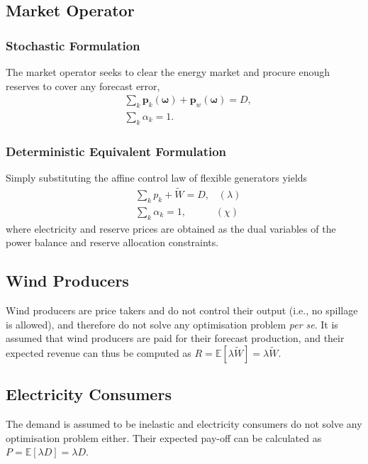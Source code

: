 \documentclass{article}
\begin{document}
\subsection{Market Operator}

\subsubsection{Stochastic Formulation}

The market operator seeks to clear the energy market and procure enough reserves to cover any forecast error,
\begin{align}
& \sum_k \mathbf{p}_k(\boldsymbol{\omega}) + \mathbf{p}_w(\boldsymbol{\omega}) = D,\\
& \sum_k \alpha_k = 1.
\end{align}

\subsubsection{Deterministic Equivalent Formulation}

Simply substituting the affine control law of flexible generators yields
\begin{align}
& \sum_k p_k + \tilde{W} = D, \hspace{10pt} (\lambda)\\
& \sum_k \alpha_k = 1, \hspace{35pt} (\chi)
\end{align}
where electricity and reserve prices are obtained as the dual variables of the power balance and reserve allocation constraints.
\subsection{Wind Producers}

Wind producers are price takers and do not control their output (i.e., no spillage is allowed), and therefore do not solve any optimisation problem \textit{per se}. It is assumed that wind producers are paid for their forecast production, and their expected revenue can thus be computed as $R = \mathbb{E}[\lambda \tilde{W}] = \lambda \tilde{W}$.

\subsection{Electricity Consumers}

The demand is assumed to be inelastic and electricity consumers do not solve any optimisation problem either. Their expected pay-off can be calculated as $P = \mathbb{E}[\lambda D] = \lambda D$.
\end{document}
